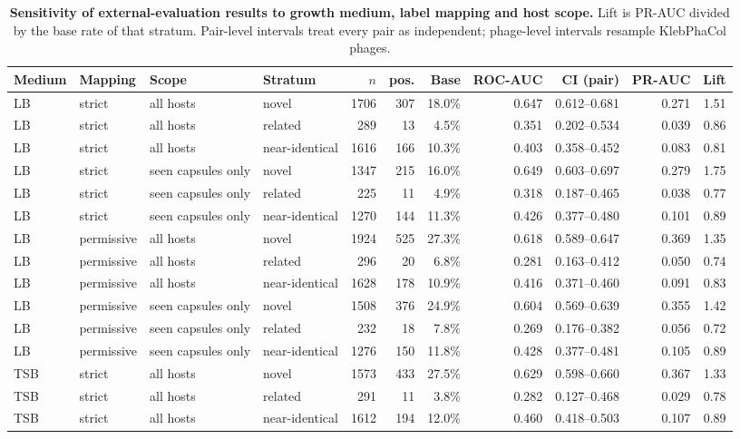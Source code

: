 \begin{table}[h]
\centering
\small
\caption{{\bf Sensitivity of external-evaluation results to growth medium, label mapping and host scope.} Lift is PR-AUC divided by the base rate of that stratum. Pair-level intervals treat every pair as independent; phage-level intervals resample KlebPhaCol phages.}
\begin{tabular}{llllrrrrrrr}
\hline
Medium & Mapping & Scope & Stratum & $n$ & pos. & Base & ROC-AUC & CI (pair) & PR-AUC & Lift \\
\hline
LB & strict & all hosts & novel & 1706 & 307 & 18.0\% & 0.647 & 0.612--0.681 & 0.271 & 1.51 \\
LB & strict & all hosts & related & 289 & 13 & 4.5\% & 0.351 & 0.202--0.534 & 0.039 & 0.86 \\
LB & strict & all hosts & near-identical & 1616 & 166 & 10.3\% & 0.403 & 0.358--0.452 & 0.083 & 0.81 \\
LB & strict & seen capsules only & novel & 1347 & 215 & 16.0\% & 0.649 & 0.603--0.697 & 0.279 & 1.75 \\
LB & strict & seen capsules only & related & 225 & 11 & 4.9\% & 0.318 & 0.187--0.465 & 0.038 & 0.77 \\
LB & strict & seen capsules only & near-identical & 1270 & 144 & 11.3\% & 0.426 & 0.377--0.480 & 0.101 & 0.89 \\
LB & permissive & all hosts & novel & 1924 & 525 & 27.3\% & 0.618 & 0.589--0.647 & 0.369 & 1.35 \\
LB & permissive & all hosts & related & 296 & 20 & 6.8\% & 0.281 & 0.163--0.412 & 0.050 & 0.74 \\
LB & permissive & all hosts & near-identical & 1628 & 178 & 10.9\% & 0.416 & 0.371--0.460 & 0.091 & 0.83 \\
LB & permissive & seen capsules only & novel & 1508 & 376 & 24.9\% & 0.604 & 0.569--0.639 & 0.355 & 1.42 \\
LB & permissive & seen capsules only & related & 232 & 18 & 7.8\% & 0.269 & 0.176--0.382 & 0.056 & 0.72 \\
LB & permissive & seen capsules only & near-identical & 1276 & 150 & 11.8\% & 0.428 & 0.377--0.481 & 0.105 & 0.89 \\
TSB & strict & all hosts & novel & 1573 & 433 & 27.5\% & 0.629 & 0.598--0.660 & 0.367 & 1.33 \\
TSB & strict & all hosts & related & 291 & 11 & 3.8\% & 0.282 & 0.127--0.468 & 0.029 & 0.78 \\
TSB & strict & all hosts & near-identical & 1612 & 194 & 12.0\% & 0.460 & 0.418--0.503 & 0.107 & 0.89 \\

\end{tabular}
\end{table}
